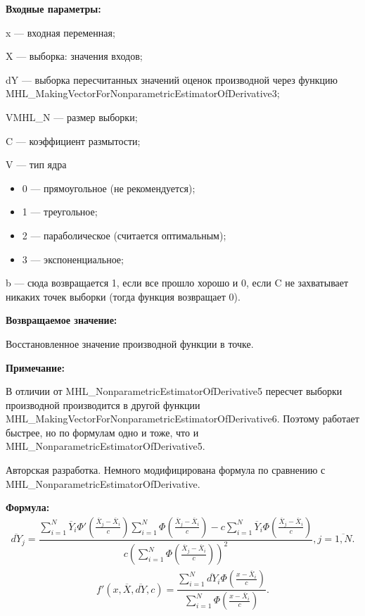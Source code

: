 \textbf{Входные параметры:} 
 
x --- входная переменная;
 
X --- выборка: значения входов;
 
dY --- выборка пересчитанных значений оценок производной через функцию MHL\_MakingVectorForNonparametricEstimatorOfDerivative3;
 
VMHL\_N --- размер выборки;
 
C --- коэффициент размытости;
 
V --- тип ядра
 
 \begin{itemize}
 \item  0 --- прямоугольное (не рекомендуется);
 \item  1 --- треугольное;
 \item  2 --- параболическое (считается оптимальным);
 \item  3 --- экспоненциальное;
 \end{itemize}
 
b --- сюда возвращается 1, если все прошло хорошо и 0, если C не захватывает никаких точек выборки (тогда функция возвращает 0).

\textbf{Возвращаемое значение:}
 
 Восстановленное значение производной функции в точке.
 
\textbf{Примечание:}

В отличии от MHL\_NonparametricEstimatorOfDerivative5 пересчет выборки производной производится в другой функции MHL\_MakingVectorForNonparametricEstimatorOfDerivative6. Поэтому работает быстрее, но по формулам одно и тоже, что и MHL\_NonparametricEstimatorOfDerivative5.

Авторская разработка. Немного модифицирована формула по сравнению с MHL\_NonparametricEstimatorOfDerivative.

\textbf{Формула:}
\begin{eqnarray*}
\overline{dY}_j =\dfrac{\sum_{i=1}^{N}\overline{Y}_i{\Phi}'\left( \frac{\overline{X}_j-\overline{X}_i}{c}\right) \sum_{i=1}^{N}\Phi\left( \frac{\overline{X}_j-\overline{X}_i}{c}\right)-c \sum_{i=1}^{N}\overline{Y}_i\Phi\left( \frac{\overline{X}_j-\overline{X}_i}{c}\right)}{c\left( \sum_{i=1}^{N}\Phi\left( \frac{\overline{X}_j-\overline{X}_i}{c}\right)\right)^2 }, j=\overline{1,N}.
\end{eqnarray*}
\begin{eqnarray*}
{f}'\left( x, \overline{X},\overline{dY}, c\right) =\dfrac{\sum_{i=1}^{N}\overline{dY}_i\Phi\left( \frac{x-\overline{X}_i}{c}\right) }{\sum_{i=1}^{N}\Phi\left( \frac{x-\overline{X}_i}{c}\right) }.
\end{eqnarray*}

